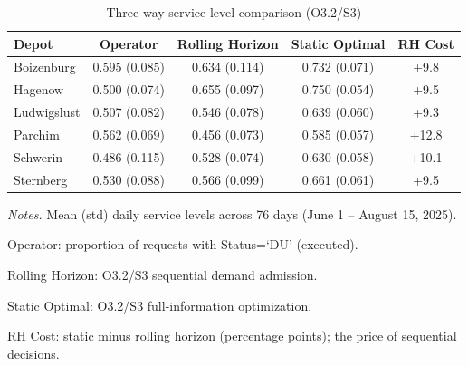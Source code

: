 \begin{table}[ht]
\centering
\caption{Three-way service level comparison (O3.2/S3)}
\label{tab:rh_comparison}
\begin{threeparttable}
\begin{tabular}{lcccc}
\toprule
Depot & Operator & Rolling Horizon & Static Optimal & RH Cost \\
\midrule
Boizenburg & 0.595 (0.085) & 0.634 (0.114) & 0.732 (0.071) & +9.8 \\
Hagenow & 0.500 (0.074) & 0.655 (0.097) & 0.750 (0.054) & +9.5 \\
Ludwigslust & 0.507 (0.082) & 0.546 (0.078) & 0.639 (0.060) & +9.3 \\
Parchim & 0.562 (0.069) & 0.456 (0.073) & 0.585 (0.057) & +12.8 \\
Schwerin & 0.486 (0.115) & 0.528 (0.074) & 0.630 (0.058) & +10.1 \\
Sternberg & 0.530 (0.088) & 0.566 (0.099) & 0.661 (0.061) & +9.5 \\
\bottomrule
\end{tabular}
\begin{tablenotes}
\smaller
\item \textit{Notes.} Mean (std) daily service levels across 76 days (June 1 -- August 15, 2025).
\item Operator: proportion of requests with Status=`DU' (executed).
\item Rolling Horizon: O3.2/S3 sequential demand admission.
\item Static Optimal: O3.2/S3 full-information optimization.
\item RH Cost: static minus rolling horizon (percentage points); the price of sequential decisions.
\end{tablenotes}
\end{threeparttable}
\end{table}
